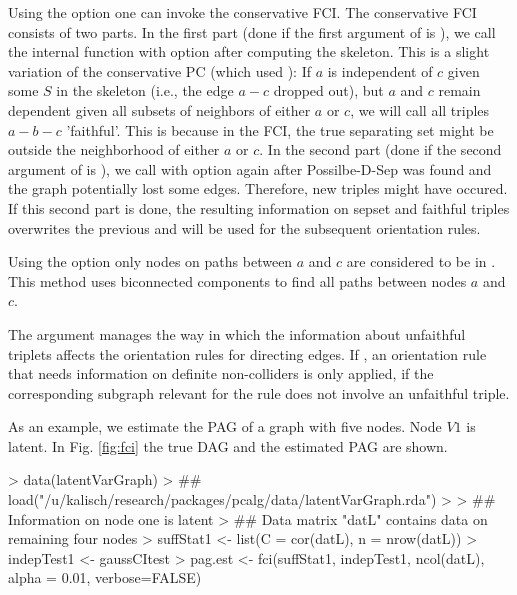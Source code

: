 \documentclass[article]{jss}
\begin{document}
Using the option  one can invoke the conservative
FCI. The conservative FCI consists of two parts. In the first part (done if
the first argument of  is ), we call the
internal function  with option  after computing the skeleton. This is a slight variation of the
conservative PC (which used ): If $a$ is
independent of $c$ given some $S$ in the skeleton (i.e., the edge $a-c$
dropped out), but $a$ and $c$ remain dependent given all subsets of
neighbors of either $a$ or $c$, we will call all triples $a-b-c$
'faithful'. This is because in the FCI, the true separating set might be
outside the neighborhood of either $a$ or $c$. In the second part (done if
the second argument of  is ), we call
 with option  again after
Possilbe-D-Sep was found and the graph potentially lost some
edges. Therefore, new triples might have occured. If this second part is
done, the resulting information on sepset and faithful triples overwrites
the previous and will be used for the subsequent orientation rules.

Using the option  only nodes on paths between $a$ and $c$
are considered to be in . This method uses biconnected
components to find all paths between nodes $a$ and $c$.

The argument  manages the way in which the information
about unfaithful triplets affects the orientation rules for directing
edges. If , an orientation rule that needs
information on definite non-colliders is only applied, if the corresponding
subgraph relevant for the rule does not involve an unfaithful triple.

As an example, we estimate the PAG of a graph with five nodes. Node
$V1$ is latent. In Fig. \ref{fig:fci} the true DAG and the estimated
PAG are shown.
          
\begin{Schunk}
\begin{Sinput}
> data(latentVarGraph)
> ## load("/u/kalisch/research/packages/pcalg/data/latentVarGraph.rda")
> 
> ## Information on node one is latent
> ## Data matrix "datL" contains data on remaining four nodes
> suffStat1 <- list(C = cor(datL), n = nrow(datL))
> indepTest1 <- gaussCItest 
> pag.est <- fci(suffStat1, indepTest1, ncol(datL), alpha = 0.01, verbose=FALSE)
\end{Sinput}
\end{Schunk}
\end{document}
